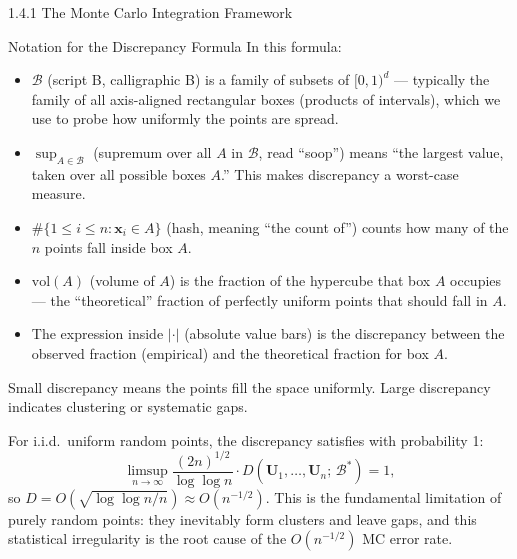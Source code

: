 \documentclass[aspectratio=169,10pt]{beamer}
\begin{document}
\begin{frame}[allowframebreaks]{1.4.1 The Monte Carlo Integration Framework}
  \begin{block}{Notation for the Discrepancy Formula}
    In this formula:
    \begin{itemize}
      \item $\mathcal{B}$ (script B, calligraphic B) is a family of subsets of
        $[0,1)^d$ --- typically the family of all axis-aligned rectangular boxes
        (products of intervals), which we use to probe how uniformly the points
        are spread.
      \item $\sup_{A \in \mathcal{B}}$ (supremum over all $A$ in $\mathcal{B}$,
        read ``soop'') means ``the largest value, taken over all possible boxes
        $A$.''  This makes discrepancy a worst-case measure.
      \item $\#\{1 \le i \le n : \mathbf{x}_i \in A\}$ (hash, meaning
        ``the count of'') counts how many of the $n$ points fall inside box $A$.
      \item $\mathrm{vol}(A)$ (volume of $A$) is the fraction of the hypercube
        that box $A$ occupies --- the ``theoretical'' fraction of perfectly
        uniform points that should fall in $A$.
      \item The expression inside $|\cdot|$ (absolute value bars) is the
        discrepancy between the observed fraction (empirical) and the theoretical
        fraction for box $A$.
    \end{itemize}
    Small discrepancy means the points fill the space uniformly.  Large
    discrepancy indicates clustering or systematic gaps.
  \end{block}

  For i.i.d.\ uniform random points, the discrepancy satisfies with probability 1:
  \[
    \limsup_{n\to\infty} \frac{(2n)^{1/2}}{\log \log n}
    \cdot D(\mathbf{U}_1, \ldots, \mathbf{U}_n;\, \mathcal{B}^*) = 1,
  \]
  so $D = O\!\left(\sqrt{\log\log n / n}\right) \approx O(n^{-1/2})$.  This is
  the fundamental limitation of purely random points: they inevitably form
  clusters and leave gaps, and this statistical irregularity is the root cause
  of the $O(n^{-1/2})$ MC error rate.

\end{frame}
\end{document}
